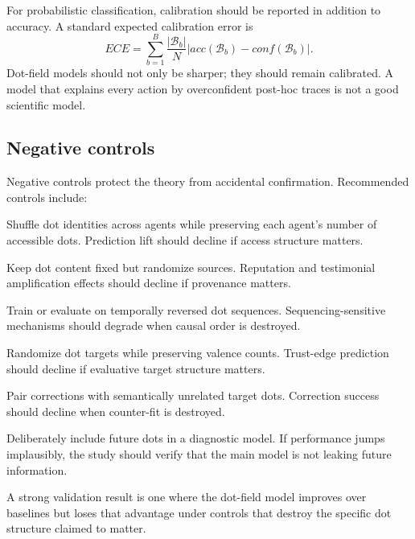 \documentclass[11pt]{article}
\theoremstyle{remark}
\begin{document}
For probabilistic classification, calibration should be reported in addition to
accuracy. A standard expected calibration error is
\[
ECE=\sum_{b=1}^{B}\frac{|\mathcal B_b|}{N}
\left|acc(\mathcal B_b)-conf(\mathcal B_b)\right|.
\]
Dot-field models should not only be sharper; they should remain calibrated. A
model that explains every action by overconfident post-hoc traces is not a good
scientific model.

\subsection{Negative controls}\label{negative-controls}

Negative controls protect the theory from accidental confirmation. Recommended
controls include:

\begin{description}[leftmargin=3.2cm,style=nextline]
\item[Dot permutation]
Shuffle dot identities across agents while preserving each agent's number of
accessible dots. Prediction lift should decline if access structure matters.

\item[Provenance shuffle]
Keep dot content fixed but randomize sources. Reputation and testimonial
amplification effects should decline if provenance matters.

\item[Temporal reversal]
Train or evaluate on temporally reversed dot sequences. Sequencing-sensitive
mechanisms should degrade when causal order is destroyed.

\item[Target shuffle]
Randomize dot targets while preserving valence counts. Trust-edge prediction
should decline if evaluative target structure matters.

\item[Counter-dot mismatch]
Pair corrections with semantically unrelated target dots. Correction success
should decline when counter-fit is destroyed.

\item[Leakage audit]
Deliberately include future dots in a diagnostic model. If performance jumps
implausibly, the study should verify that the main model is not leaking future
information.
\end{description}

A strong validation result is one where the dot-field model improves over
baselines but loses that advantage under controls that destroy the specific dot
structure claimed to matter.
\end{document}

